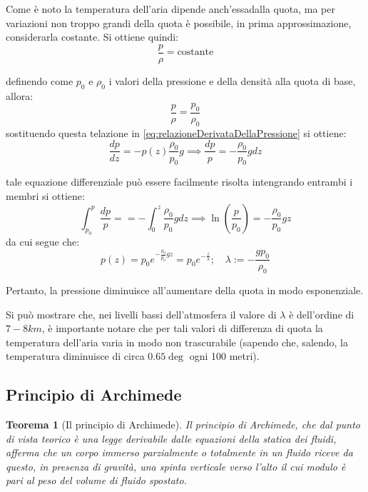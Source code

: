 \documentclass[11pt, a4paper, openright]{book}
\theoremstyle{plain}
\newtheorem{theorem}{Teorema}[section]
\theoremstyle{definition}
\begin{document}
Come è noto la temperatura dell'aria dipende anch'essadalla quota, ma per variazioni non troppo grandi della quota è possibile, in prima approssimazione, considerarla costante. Si ottiene quindi:
\begin{equation}
    \frac{p}{\rho} = \text{costante}
\end{equation}

definendo come $p_0$ e $\rho_0$ i valori della pressione e della densità alla quota di base, allora:
\begin{equation}
    \frac{p}{\rho} = \frac{p_0}{\rho_0}
\end{equation}
sostituendo questa telazione in \ref{eq:relazioneDerivataDellaPressione} si ottiene:
\begin{equation}
    \frac{dp}{dz} = -p(z)\frac{\rho_0}{p_0} g \implies \frac{dp}{p} = - \frac{\rho_0}{p_0} g dz
\end{equation}

tale equazione differenziale può essere facilmente risolta intengrando entrambi i membri si ottiene:
\begin{equation}
    \int_{p_0}^{p} \frac{dp}{p} = = - \int_{0}^{z} \frac{\rho_0}{p_0}gdz \implies \ln(\frac{p}{p_0}) = - \frac{\rho_0}{p_0} g z 
\end{equation}
da cui segue che:
\begin{equation}
    p(z) = p_0e^{\displaystyle -\frac{\rho_0}{p_0}gz} = p_0 e^{\displaystyle -\frac{z}{\lambda}}; \quad \lambda := -\frac{gp_0}{\rho_0}
\end{equation}

Pertanto, la pressione diminuisce all'aumentare della quota in modo esponenziale.

Si può mostrare che, nei livelli bassi dell'atmosfera il valore di $\lambda$ è dell'ordine di $7-8km$, è importante notare che per tali valori di differenza di quota la temperatura dell'aria varia in modo non trascurabile (sapendo che, salendo, la temperatura diminuisce di circa $0.65 \deg$ ogni 100 metri).

\subsection{Principio di Archimede}

\begin{theorem}[Il principio di Archimede]
Il principio di Archimede, che dal punto di vista teorico è una legge derivabile dalle equazioni della statica dei fluidi, afferma che un corpo immerso parzialmente o totalmente in un fluido riceve da questo, in presenza di gravità, una spinta verticale verso l'alto il cui modulo è pari al peso del volume di fluido spostato.
\end{theorem}
\end{document}
